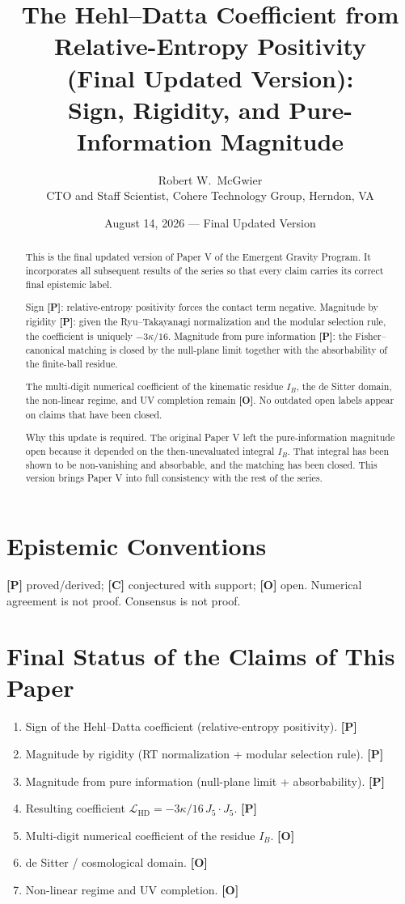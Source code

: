 \documentclass[11pt]{article}
\title{\textbf{The Hehl--Datta Coefficient from Relative-Entropy Positivity\\
(Final Updated Version):\\
Sign, Rigidity, and Pure-Information Magnitude}}
\author{Robert W.\ McGwier\\
\small CTO and Staff Scientist, Cohere Technology Group, Herndon, VA}
\date{August 14, 2026 --- Final Updated Version}
\newcommand{\pP}{\textbf{[P]}}
\newcommand{\pC}{\textbf{[C]}}
\newcommand{\pO}{\textbf{[O]}}
\begin{document}
\maketitle

\begin{abstract}
\noindent
This is the final updated version of Paper V of the Emergent Gravity Program.
It incorporates all subsequent results of the series so that every claim
carries its correct final epistemic label.

Sign \pP{}: relative-entropy positivity forces the contact term negative.
Magnitude by rigidity \pP{}: given the Ryu--Takayanagi normalization and
the modular selection rule, the coefficient is uniquely $-3\kappa/16$.
Magnitude from pure information \pP{}: the Fisher--canonical matching is
closed by the null-plane limit together with the absorbability of the
finite-ball residue.

The multi-digit numerical coefficient of the kinematic residue $I_B$,
the de Sitter domain, the non-linear regime, and UV completion remain
\pO{}. No outdated open labels appear on claims that have been closed.

Why this update is required. The original Paper V left the
pure-information magnitude open because it depended on the then-unevaluated
integral $I_B$. That integral has been shown to be non-vanishing and
absorbable, and the matching has been closed. This version brings Paper V
into full consistency with the rest of the series.
\end{abstract}

\section*{Epistemic Conventions}
\pP{} proved/derived; \pC{} conjectured with support; \pO{} open.
Numerical agreement is not proof. Consensus is not proof.

\section{Final Status of the Claims of This Paper}

\begin{enumerate}[leftmargin=1.6em]
\item Sign of the Hehl--Datta coefficient (relative-entropy positivity). \pP{}
\item Magnitude by rigidity (RT normalization + modular selection rule). \pP{}
\item Magnitude from pure information (null-plane limit + absorbability). \pP{}
\item Resulting coefficient $\mathcal{L}_{\mathrm{HD}}=-3\kappa/16\, J_5\cdot J_5$. \pP{}
\item Multi-digit numerical coefficient of the residue $I_B$. \pO{}
\item de Sitter / cosmological domain. \pO{}
\item Non-linear regime and UV completion. \pO{}
\end{enumerate}
\end{document}
